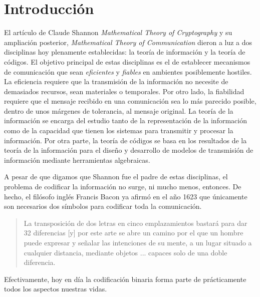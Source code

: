 \chapter*{Introducción}
 
El artículo de Claude Shannon \textit{Mathematical Theory of Cryptography} \parencite{shannon_mathematical_1945} y su ampliación posterior, \textit{Mathematical Theory of Communication} \parencite{shannon_mathematical_1948} dieron a luz a dos disciplinas hoy plenamente establecidas: la teoría de información y la teoría de códigos.
El objetivo principal de estas disciplinas es el de establecer mecanismos de comunicación que sean \emph{eficientes} y \emph{fiables} en ambientes posiblemente hostiles.
La eficiencia requiere que la transmisión de la información no necesite de demasiados recursos, sean materiales o temporales.
Por otro lado, la fiabilidad requiere que el mensaje recibido en una comunicación sea lo más parecido posible, dentro de unos márgenes de tolerancia, al mensaje original.
La teoría de la información se encarga del estudio tanto de la representación de la información como de la capacidad que tienen los sistemas para transmitir y procesar la información. 
Por otra parte, la teoría de códigos se basa en los resultados de la teoría de la información para el diseño y desarrollo de modelos de transmisión de información mediante herramientas algebraicas.

A pesar de que digamos que Shannon fue el padre de estas disciplinas, el problema de codificar la información no surge, ni mucho menos, entonces.
De hecho, el filósofo inglés Francis Bacon ya afirmó en el año 1623 que únicamente son necesarios dos símbolos para codificar toda la comunicación.
\blockquote[{\cite[30]{dyson_catedral_2015}}]{La transposición de dos letras en cinco emplazamientos bastará para dar 32 diferencias [y] por este arte se abre un camino por el que un hombre puede expresar y señalar las intenciones de su mente, a un lugar situado a cualquier distancia, mediante objetos ... capaces solo de una doble diferencia.}
Efectivamente, hoy en día la codificación binaria forma parte de prácticamente todos los aspectos nuestras vidas.


